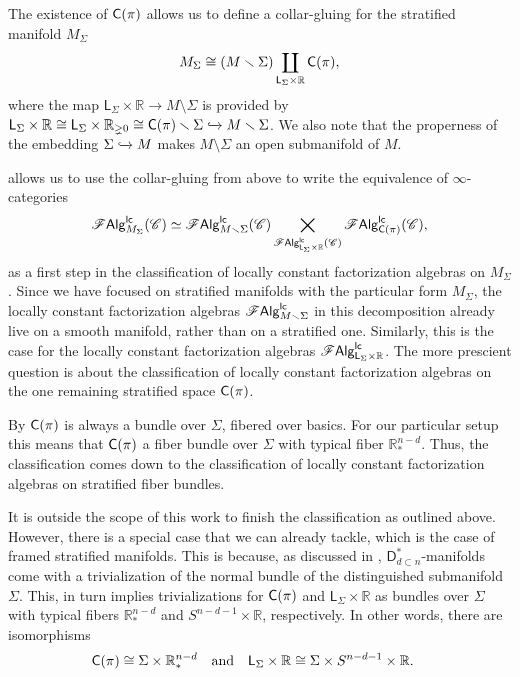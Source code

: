 \documentclass[../text]{subfiles}
\begin{document}
\begin{construction}
    The existence of $\cone(\pi)$ allows us to define a collar-gluing for the stratified manifold $M_\Sigma$
    \begin{equation}\label{eq:M_Sigma_decomposition}
        M_\Sigma \cong \left( M \setminus \Sigma \right) \coprod_{\mathsf{L}_\Sigma \times \mathbb{R}} \cone(\pi),
    \end{equation}
    where the map $\mathsf{L}_\Sigma \times \mathbb{R} \rightarrow M \setminus \Sigma$ is provided by $\mathsf{L}_\Sigma \times \mathbb{R} \cong \mathsf{L}_\Sigma \times \mathbb{R}_{\gneq 0} \cong \cone(\pi) \setminus \Sigma \xhookrightarrow{} M \setminus \Sigma$. We also note that the properness of the embedding $\Sigma \xhookrightarrow{} M$ makes $M \setminus \Sigma$ an open submanifold of $M$.
\end{construction}


 allows us to use the collar-gluing from above to write the equivalence of $\infty$-categories
%
\begin{equation}
    \lcfa_{M_\Sigma} (\catC) \simeq \lcfa_{M \setminus \Sigma} (\catC) \bigtimes_{\lcfa_{\mathsf{L}_\Sigma \times \mathbb{R}} (\catC)} \lcfa_{\cone(\pi)} (\catC),
\end{equation}
%
as a first step in the classification of locally constant factorization algebras on $M_{\Sigma}$. Since we have focused on stratified manifolds with the particular form $M_{\Sigma}$, the locally constant factorization algebras $\mathscr{F} \mathsf{Alg}^{\mathsf{lc}}_{M \smallsetminus \Sigma}$ in this decomposition already live on a smooth manifold, rather than on a stratified one. Similarly, this is the case for the locally constant factorization algebras $\mathscr{F} \mathsf{Alg}^{\mathsf{lc}}_{\mathsf{L}_\Sigma \times \mathbb{R}}$. The more prescient question is about the classification of locally constant factorization algebras on the one remaining stratified space $\cone(\pi)$. 

By \cite[ex.3.6.6]{aft_localstrut} $\cone(\pi)$ is always a bundle over $\Sigma$, fibered over basics. For our particular setup this means that $\cone(\pi)$ a fiber bundle over $\Sigma$ with typical fiber $\mathbb{R}^{n-d}_*$. Thus, the classification comes down to the classification of locally constant factorization algebras on stratified fiber bundles.

It is outside the scope of this work to finish the classification as outlined above. However, there is a special case that we can already tackle, which is the case of framed stratified manifolds. This is because, as discussed in , $\mathsf{D}_{d \subset n}^*$-manifolds come with a trivialization of the normal bundle of the distinguished submanifold $\Sigma$. This, in turn implies trivializations for $\cone(\pi)$ and $\mathsf{L}_{\Sigma} \times \mathbb{R}$ as bundles over $\Sigma$ with typical fibers $\mathbb{R}^{n-d}_*$ and $S^{n-d-1} \times \mathbb{R}$, respectively. In other words, there are isomorphisms
%
\begin{align}
    &\cone(\pi) \cong \Sigma \times \mathbb{R}^{n-d}_*& &\mathrm{and}& &\mathsf{L}_{\Sigma} \times \mathbb{R} \cong \Sigma \times S^{n-d-1} \times \mathbb{R}.&
\end{align}
\end{document}
